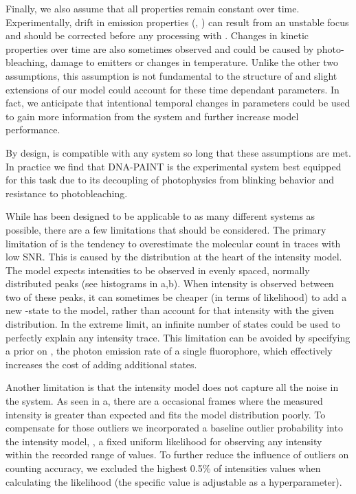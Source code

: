   Finally, we also assume that all properties remain constant over time. 
  Experimentally, drift in emission properties (\re, \rb) can result from 
  an unstable focus and should be corrected before any processing with
  \ours.
  Changes in kinetic properties over time are also sometimes observed and could
  be caused by photo-bleaching, damage to emitters or changes in temperature. 
  Unlike the other two assumptions, this assumption is not fundamental to the
  structure of \ours and slight extensions of our model could account for these
  time dependant parameters.
  In fact, we anticipate that intentional temporal changes in parameters could be used to gain more
  information from the system and further increase model performance.

By design, \ours is compatible with any
system so long that these assumptions are met.
  In practice we find that DNA-PAINT is the experimental system best equipped for this task 
  due to its decoupling of photophysics from blinking behavior and resistance to photobleaching. 

While \ours has been designed to be applicable to as many different systems as
possible, there are a few limitations that should be considered.
  The primary limitation of \ours is the tendency to overestimate the molecular
  count in traces with low SNR.
  This is caused by the distribution at the heart of the intensity model. 
  The model expects intensities to be observed in evenly spaced, normally
  distributed peaks (see histograms in a,b).
  When intensity is observed between two of these peaks, it can sometimes be
  cheaper (in terms of likelihood) to add a new \z{}-state to the model, rather
  than account for that intensity with the given distribution.
  In the extreme limit, an infinite number of states could be used to perfectly
  explain any intensity trace.
  This limitation can be avoided by specifying a prior on \re, the photon
  emission rate of a single fluorophore, which effectively increases the cost
  of adding additional states.

Another limitation is that the intensity model does not capture all the noise
in the system.
    As seen in a, there are a occasional
    frames where the measured intensity is greater than expected and 
    fits the model distribution poorly.
    To compensate for those outliers we incorporated a baseline outlier
    probability into the intensity model, \ie, a fixed uniform likelihood for
    observing any intensity within the recorded range of values.
    To further reduce the influence of outliers on counting accuracy, we
    excluded the highest 0.5\% of intensities values when calculating the
    likelihood (the specific value is adjustable as a hyperparameter).

